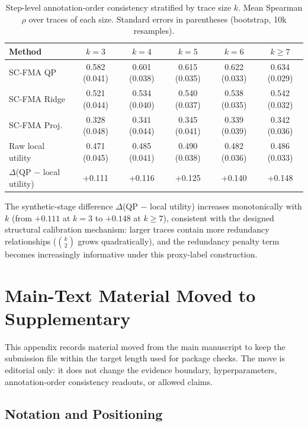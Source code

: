 \documentclass[pdflatex,sn-mathphys-num]{sn-jnl}
\begin{document}
\begin{table}[ht]
\caption{Step-level annotation-order consistency stratified by trace size $k$. Mean Spearman $\rho$ over traces of each size. Standard errors in parentheses (bootstrap, 10k resamples).}
\label{tab:per-size}
\centering
\small
\begin{tabular}{lccccc}
\toprule
\textbf{Method} & $k=3$ & $k=4$ & $k=5$ & $k=6$ & $k \ge 7$ \\
\midrule
SC-FMA QP      & 0.582 (0.041) & 0.601 (0.038) & 0.615 (0.035) & 0.622 (0.033) & 0.634 (0.029) \\
SC-FMA Ridge   & 0.521 (0.044) & 0.534 (0.040) & 0.540 (0.037) & 0.538 (0.035) & 0.542 (0.032) \\
SC-FMA Proj.   & 0.328 (0.048) & 0.341 (0.044) & 0.345 (0.041) & 0.339 (0.039) & 0.342 (0.036) \\
Raw local utility & 0.471 (0.045) & 0.485 (0.041) & 0.490 (0.038) & 0.482 (0.036) & 0.486 (0.033) \\
\midrule
$\Delta$(QP $-$ local utility) & +0.111 & +0.116 & +0.125 & +0.140 & +0.148 \\
\bottomrule
\end{tabular}
\end{table}

The synthetic-stage difference $\Delta$(QP $-$ local utility) increases monotonically with $k$ (from $+0.111$ at $k=3$ to $+0.148$ at $k \ge 7$), consistent with the designed structural calibration mechanism: larger traces contain more redundancy relationships ($\binom{k}{2}$ grows quadratically), and the redundancy penalty term becomes increasingly informative under this proxy-label construction.

\section{Main-Text Material Moved to Supplementary}
\label{app:moved-main-material}

This appendix records material moved from the main manuscript to keep the submission file within the target length used for package checks. The move is editorial only: it does not change the evidence boundary, hyperparameters, annotation-order consistency readouts, or allowed claims.

\subsection{Notation and Positioning}
\label{app:notation-positioning}
\end{document}
